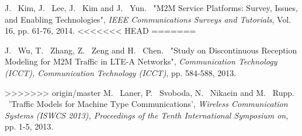 \documentclass[journal]{IEEEtran}
\begin{document}

%
%
%
\begin{thebibliography}{1}

J. ~Kim, J. ~Lee, J. ~Kim and J. ~Yun. ~"M2M Service Platforms: Survey, Issues, and Enabling Technologies", \emph{IEEE Communications Surveys and Tutorials}, Vol. 16, pp. 61-76, 2014.
<<<<<<< HEAD
=======

J. ~Wu, T. ~Zhang, Z. ~Zeng and H. ~Chen. ~"Study on Discontinuous Reception Modeling for M2M Traffic in LTE-A Networks", \emph{Communication Technology (ICCT), Communication Technology (ICCT)}, pp. 584-588, 2013.

>>>>>>> origin/master
M. ~Laner, P. ~Svoboda, N. ~Nikaein and M. ~Rupp. ~'Traffic Models for Machine Type Communications', \emph{Wireless Communication Systems (ISWCS 2013), Proceedings of the Tenth International Symposium on}, pp. 1-5, 2013.
  
\end{thebibliography}
\end{document}
